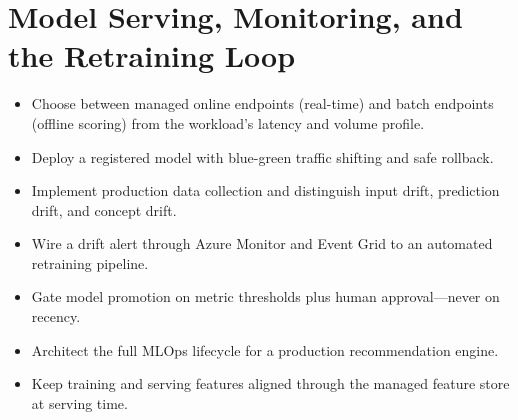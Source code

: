 \chapter{Model Serving, Monitoring, and the Retraining Loop}
%
\begin{objectives}
\begin{itemize}
    \item Choose between managed online endpoints (real-time) and batch endpoints (offline scoring) from the workload's latency and volume profile.
    \item Deploy a registered model with blue-green traffic shifting and safe rollback.
    \item Implement production data collection and distinguish input drift, prediction drift, and concept drift.
    \item Wire a drift alert through Azure Monitor and Event Grid to an automated retraining pipeline.
    \item Gate model promotion on metric thresholds plus human approval---never on recency.
    \item Architect the full MLOps lifecycle for a production recommendation engine.
    \item Keep training and serving features aligned through the managed feature store at serving time.
\end{itemize}
\end{objectives}

